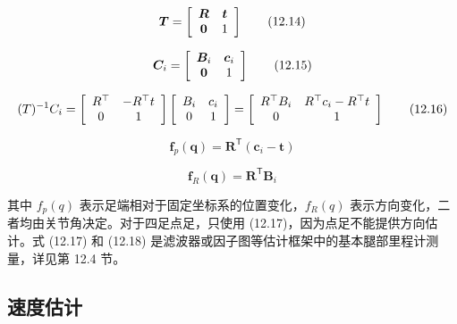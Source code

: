 \begin{equation}
\boldsymbol {T} = \left[ \begin{array}{c c} \boldsymbol {R} & \boldsymbol {t} \\ \boldsymbol {0} & 1 \end{array} \right]\tag{12.14}
\end{equation}

\begin{equation}
\boldsymbol {C} _ {i} = \left[ \begin{array}{c c} \boldsymbol {B} _ {i} & \boldsymbol {c} _ {i} \\ \boldsymbol {0} & 1 \end{array} \right]\tag{12.15}
\end{equation}

\begin{equation}
(T) ^ {- 1} C _ {i} = \left[ \begin{array}{c c} R ^ {\top} & - R ^ {\top} t \\ 0 & 1 \end{array} \right] \left[ \begin{array}{c c} B _ {i} & c _ {i} \\ 0 & 1 \end{array} \right] = \left[ \begin{array}{c c} R ^ {\top} B _ {i} & R ^ {\top} c _ {i} - R ^ {\top} t \\ 0 & 1 \end{array} \right]\tag{12.16}
\end{equation}

\begin{equation}
\mathbf {f} _ {p} (\boldsymbol {q}) = \boldsymbol {R} ^ {\mathsf {T}} (\boldsymbol {c} _ {i} - \boldsymbol {t})\tag{12.17}
\end{equation}

\begin{equation}
\mathbf {f} _ {R} (\pmb {q}) = \pmb {R} ^ {\mathsf {T}} \pmb {B} _ {i}\tag{12.18}
\end{equation}

其中 $f_p(q)$ 表示足端相对于固定坐标系的位置变化，$f_R(q)$ 表示方向变化，二者均由关节角决定。对于四足点足，只使用 (12.17)，因为点足不能提供方向估计。式 (12.17) 和 (12.18) 是滤波器或因子图等估计框架中的基本腿部里程计测量，详见第 12.4 节。

\subsection{速度估计}

